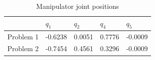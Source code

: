 \begin{table}[!htb]
\caption{Manipulator joint positions}
\label{tab:effector}
\centering
\begin{tabular}{l|l|l|l|l|}
\cline{2-5}
                                  & $q_1$   & $q_2$  & $q_4$  & $q_5$   \\ \hline
\multicolumn{1}{|l|}{Problem 1} & -0.6238 & 0.0051 & 0.7776 & -0.0009 \\ \hline
\multicolumn{1}{|l|}{Problem 2} & -0.7454 & 0.4561 & 0.3296 & -0.0009 \\ \hline
\end{tabular}
\end{table}
